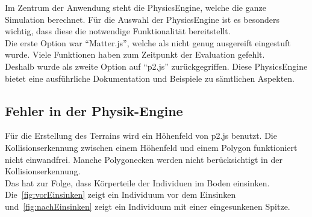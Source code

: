       Im Zentrum der Anwendung steht die \gls{PhysicsEngine}, welche die ganze Simulation berechnet.
      Für die Auswahl der \gls{PhysicsEngine} ist es besonders wichtig,
      dass diese die notwendige Funktionalität bereitstellt.
      \\
      Die erste Option war ``Matter.js'', welche als nicht genug ausgereift eingestuft wurde.
      Viele Funktionen haben zum Zeitpunkt der Evaluation gefehlt.
      \\
      Deshalb wurde als zweite Option auf ``p2.js'' zurückgegriffen.
      Diese \gls{PhysicsEngine} bietet eine ausführliche Dokumentation und Beispiele zu sämtlichen Aspekten.

    \subsection{Fehler in der Physik-Engine}

      Für die Erstellung des Terrains wird ein Höhenfeld von p2.js benutzt.
      Die Kollisionserkennung zwischen einem Höhenfeld und einem Polygon funktioniert nicht einwandfrei.
      Manche Polygonecken werden nicht berücksichtigt in der Kollisionserkennung.
      \\
      Das hat zur Folge, dass Körperteile der Individuen im Boden einsinken.
      Die~\vref{fig:vorEinsinken} zeigt ein Individuum vor dem Einsinken
      und~\vref{fig:nachEinsinken} zeigt ein Individuum mit einer eingesunkenen Spitze.

